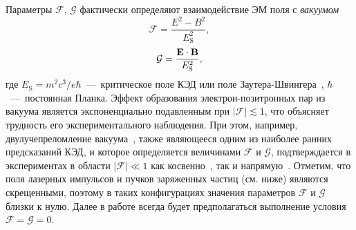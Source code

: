 Параметры $\mathcal{F}$, $\mathcal{G}$ фактически определяют взаимодействие ЭМ поля с \textit{вакуумом}
\begin{equation}
  \mathcal{F} = \frac{E^2 - B^2}{E_\mathrm{S}^2},
\end{equation}
\begin{equation}
  \mathcal{G} = \frac{\vb{E}\cdot\vb{B}}{E_\mathrm{S}^2},
\end{equation}
где $E_\mathrm{S} = m^2 c^3/e\hbar$~---~критическое поле КЭД или поле Заутера-Швингера~\cite{berestetskii1982quantum, Baier98}, $\hbar$~---~постоянная Планка.
Эффект образования электрон-позитронных пар из вакуума является экспоненциально подавленным при $|\mathcal{F}|\lesssim 1$, что объясняет трудность его экспериментального наблюдения.
При этом, например, двулучепреломление вакуума~\cite{dirac1934discussion, serber1935linear, uehling1935polarization, heisenberg1936folgerungen}, также являющееся одним из наиболее ранних предсказаний КЭД, и которое определяется величинами $\mathcal{F}$ и $\mathcal{G}$, подтверждается в экспериментах в области $|\mathcal{F}|\ll 1$ как косвенно~\cite{bennett2006final, hanneke2008new}, так и напрямую~\cite{atlas2017evidence}.
Отметим, что поля лазерных импульсов и пучков заряженных частиц (см. ниже) являются скрещенными, поэтому в таких конфигурациях значения параметров $\mathcal{F}$ и $\mathcal{G}$ близки к нулю.
Далее в работе всегда будет предполагаться выполнение условия $\mathcal{F} = \mathcal{G} = 0$.


